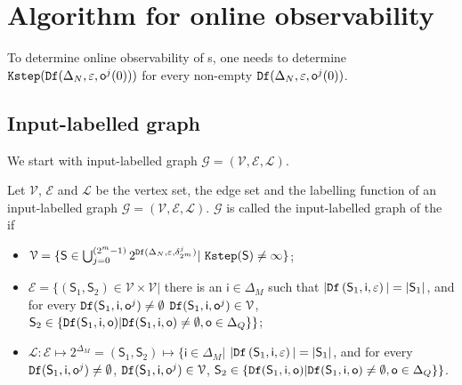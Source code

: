 
\section{Algorithm for online observability}
\label{sec:deter}
To  determine  online observability of \BCN s, one needs to determine ${\tt Kstep}({\tt Df}(\Delta_N,\varepsilon,\mathsf{o}^{j}(0)))$ for every non-empty ${\tt Df}(\Delta_N,\varepsilon, \mathsf{o}^{j}(0))$. 

\subsection{Input-labelled graph}
We start with input-labelled graph $\mathcal{G}=(\mathcal{V}, \mathcal{E}, \mathcal{L})$.

\begin{definition}
Let $\mathcal{V}$, $\mathcal{E}$ and $\mathcal{L}$ be the vertex set, the edge set and the labelling function of an input-labelled graph $\mathcal{G}=(\mathcal{V}, \mathcal{E}, \mathcal{L})$. $\mathcal{G}$ is called the input-labelled graph of the \BCN\, if 
\begin{itemize}
\item  $\mathcal{V}=\{\mathsf{S}\in\bigcup_{j=0}^{(2^m -1)} 2^{{\tt Df}(\Delta_N,\varepsilon,\delta^j_{2^m} )}|\ {\tt Kstep}(\mathsf{S})\ne \infty\}$;
\item  $\mathcal{E}=\{(\mathsf{S}_1,\mathsf{S}_2)\in \mathcal{V}\times \mathcal{V}|$ there is an $\mathsf{i} \in \Delta_M$ such that $|{\tt Df}\left(\mathsf{S}_1,\mathsf{i},\varepsilon\right)|=|\mathsf{S}_1|$, and for every ${\tt Df}(\mathsf{S}_1,\mathsf{i},\mathsf{o}^{j})\neq \emptyset$ ${\tt Df}(\mathsf{S}_1,\mathsf{i},\mathsf{o}^{j})\in \mathcal{V}$, $\mathsf{S}_2\in\{{\tt Df}(\mathsf{S}_1,\mathsf{i},\mathsf{o})| {\tt Df}(\mathsf{S}_1,\mathsf{i},\mathsf{o})\neq \emptyset, \mathsf{o}\in \Delta_Q\}\}$;
\item  $\mathcal{L}:\mathcal{E}\mapsto 2^{\Delta_M}=(\mathsf{S}_1,\mathsf{S}_2)\mapsto\{\mathsf{i}\in \Delta_M|$ $|{\tt Df}\left(\mathsf{S}_1,\mathsf{i},\varepsilon\right)|=|\mathsf{S}_1|$, and for every ${\tt Df}(\mathsf{S}_1,\mathsf{i},\mathsf{o}^{j})\neq \emptyset$, ${\tt Df}(\mathsf{S}_1,\mathsf{i},\mathsf{o}^{j})\in \mathcal{V}$, $\mathsf{S}_2\in\{{\tt Df}(\mathsf{S}_1,\mathsf{i},\mathsf{o})| {\tt Df}(\mathsf{S}_1,\mathsf{i},\mathsf{o})\neq \emptyset, \mathsf{o}\in \Delta_Q\}\}$.
 \end{itemize}
\end{definition}


